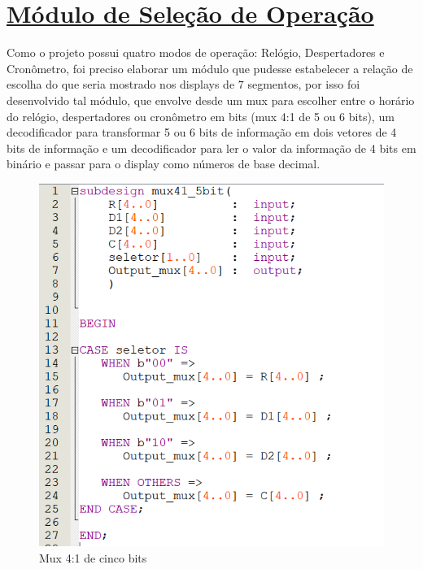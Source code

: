 \documentclass[14pt, oneside]{book}
\newcommand\tab[1][1cm]{\hspace*{#1}}
\theoremstyle{definition}
\begin{document}
            \section[Módulo de Seleção de Operação]{\hyperlink{toc}{Módulo de Seleção de Operação}}
                \tab Como o projeto possui quatro modos de operação: Relógio, Despertadores e Cronômetro, foi preciso elaborar um módulo que pudesse estabelecer a relação de escolha do que seria mostrado nos displays de $7$ segmentos, por isso foi desenvolvido tal módulo, que envolve desde um mux para escolher entre o horário do relógio, despertadores ou cronômetro em bits (mux 4:1 de 5 ou 6 bits), um decodificador para transformar 5 ou 6 bits de informação em dois vetores de 4 bits de informação e um decodificador para ler o valor da informação de 4 bits em binário e passar para o display como números de base decimal. \\
                \begin{figure}[H]
                    \centering   
                    \includegraphics[scale = 1]{mux_41_5bit.PNG}
                    \caption{Mux 4:1 de cinco bits}
                    \label{mux41}
                \end{figure} \\
\end{document}
